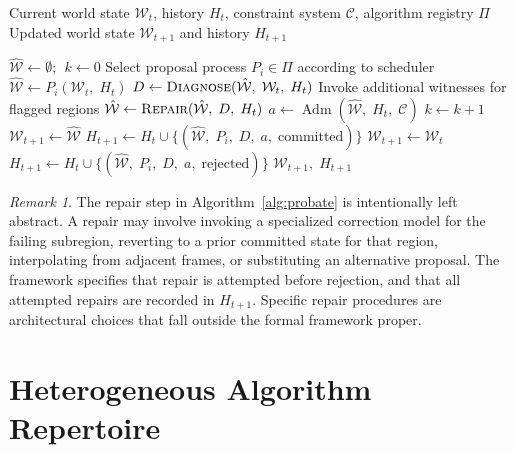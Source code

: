 \documentclass[11pt,a4paper]{article}
\theoremstyle{plain}
\theoremstyle{definition}
\theoremstyle{remark}
\newtheorem{remark}[theorem]{Remark}
\DeclareMathOperator{\Adm}{Adm}
\begin{document}
\begin{algorithm}[h]
\caption{Probate Loop for World State Continuation}
\label{alg:probate}
\begin{algorithmic}[1]
\Require Current world state $\mathcal{W}_t$, history $H_t$, constraint system $\mathcal{C}$, algorithm registry $\Pi$
\Ensure Updated world state $\mathcal{W}_{t+1}$ and history $H_{t+1}$

\State $\hat{\mathcal{W}} \gets \emptyset$; $\;k \gets 0$
    \State Select proposal process $P_i \in \Pi$ according to scheduler
    \State $\hat{\mathcal{W}} \gets P_i(\mathcal{W}_t,\; H_t)$ 
    \State $D \gets \textsc{Diagnose}(\hat{\mathcal{W}},\; \mathcal{W}_t,\; H_t)$ 
        \State Invoke additional witnesses for flagged regions 
        \State $\hat{\mathcal{W}} \gets \textsc{Repair}(\hat{\mathcal{W}},\; D,\; H_t)$ 
    \EndIf
    \State $a \gets \Adm(\hat{\mathcal{W}},\; H_t,\; \mathcal{C})$ 
    \State $k \gets k + 1$
\EndWhile
{}
    \State $\mathcal{W}_{t+1} \gets \hat{\mathcal{W}}$
    \State $H_{t+1} \gets H_t \cup \{(\hat{\mathcal{W}},\; P_i,\; D,\; a,\; \text{committed})\}$ 
\Else
    \State $\mathcal{W}_{t+1} \gets \mathcal{W}_t$ 
    \State $H_{t+1} \gets H_t \cup \{(\hat{\mathcal{W}},\; P_i,\; D,\; a,\; \text{rejected})\}$
\EndIf
\State \Return $\mathcal{W}_{t+1},\; H_{t+1}$
\end{algorithmic}
\end{algorithm}

\begin{remark}
The repair step in Algorithm~\ref{alg:probate} is intentionally left abstract. A repair may involve invoking a specialized correction model for the failing subregion, reverting to a prior committed state for that region, interpolating from adjacent frames, or substituting an alternative proposal. The framework specifies that repair is attempted before rejection, and that all attempted repairs are recorded in $H_{t+1}$. Specific repair procedures are architectural choices that fall outside the formal framework proper.
\end{remark}

\section{Heterogeneous Algorithm Repertoire}
\label{sec:repertoire}
\end{document}

